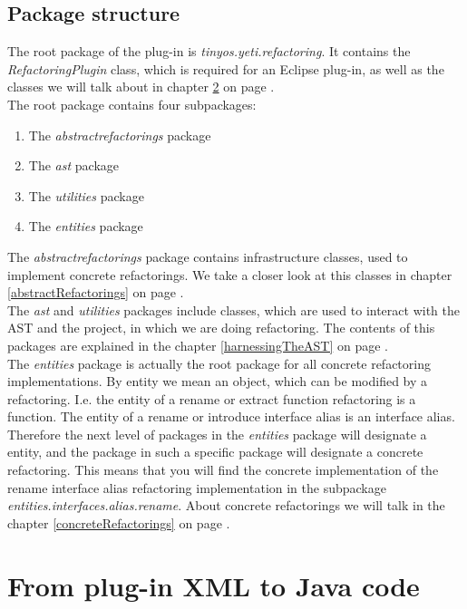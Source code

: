 \documentclass[a4paper,10pt]{report}
\begin{document}
\section{Package structure}
The root package of the plug-in is {\it tinyos.yeti.refactoring}.
It contains the {\it RefactoringPlugin} class, which is required for an Eclipse plug-in, as well as the classes we will talk about in chapter \ref{fromPluginXMLToJavaCode} on page \pageref{fromPluginXMLToJavaCode}.\\
The root package contains four subpackages:
   \begin{enumerate}
     \item The {\it abstractrefactorings} package
     \item The {\it ast} package
     \item The {\it utilities} package
     \item The {\it entities} package
   \end{enumerate}
The {\it abstractrefactorings} package contains infrastructure classes, used to implement concrete refactorings.
We take a closer look at this classes in chapter \ref{abstractRefactorings} on page \pageref{abstractRefactorings}.\\
The {\it ast} and {\it utilities} packages include classes, which are used to interact with the AST and the project, in which we are doing refactoring.
The contents of this packages are explained in the chapter \ref{harnessingTheAST} on page \pageref{harnessingTheAST}.\\
The {\it entities} package is actually the root package for all concrete refactoring implementations.
By entity we mean an object, which can be modified by a refactoring.
I.e. the entity of a rename or extract function refactoring is a function.
The entity of a rename or introduce interface alias is an interface alias.
Therefore the next level of packages in the {\it entities} package will designate a entity, and the package in such a specific package will designate a concrete refactoring.
This means that you will find the concrete implementation of the rename interface alias refactoring implementation in the subpackage {\it entities.interfaces.alias.rename}.
About concrete refactorings we will talk in the chapter \ref{concreteRefactorings} on page \pageref{concreteRefactorings}.


\chapter{From plug-in XML to Java code}
\label{fromPluginXMLToJavaCode}
\end{document}
